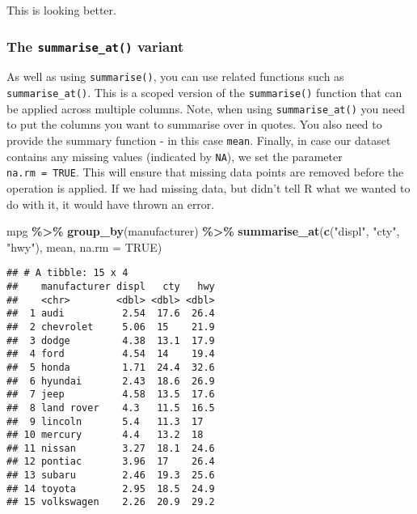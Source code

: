 \documentclass[
]{book}
\newenvironment{Shaded}{\begin{snugshade}}{\end{snugshade}}
\newcommand{\AttributeTok}[1]{\textcolor[rgb]{0.13,0.29,0.53}{#1}}
\newcommand{\ConstantTok}[1]{\textcolor[rgb]{0.56,0.35,0.01}{#1}}
\newcommand{\FunctionTok}[1]{\textcolor[rgb]{0.13,0.29,0.53}{\textbf{#1}}}
\newcommand{\NormalTok}[1]{#1}
\newcommand{\SpecialCharTok}[1]{\textcolor[rgb]{0.81,0.36,0.00}{\textbf{#1}}}
\newcommand{\StringTok}[1]{\textcolor[rgb]{0.31,0.60,0.02}{#1}}
\begin{document}
This is looking better.

\hypertarget{the-summarise_at-variant}{%
\subsubsection*{\texorpdfstring{The \texttt{summarise\_at()} variant}{The summarise\_at() variant}}\label{the-summarise_at-variant}}

As well as using \texttt{summarise()}, you can use related functions such as \texttt{summarise\_at()}. This is a scoped version of the \texttt{summarise()} function that can be applied across multiple columns. Note, when using \texttt{summarise\_at()} you need to put the columns you want to summarise over in quotes. You also need to provide the summary function - in this case \texttt{mean}. Finally, in case our dataset contains any missing values (indicated by \texttt{NA}), we set the parameter \texttt{na.rm\ =\ TRUE}. This will ensure that missing data points are removed before the operation is applied. If we had missing data, but didn't tell R what we wanted to do with it, it would have thrown an error.

\begin{Shaded}
\begin{Highlighting}[]
\NormalTok{mpg }\SpecialCharTok{\%\textgreater{}\%} 
  \FunctionTok{group\_by}\NormalTok{(manufacturer) }\SpecialCharTok{\%\textgreater{}\%}
  \FunctionTok{summarise\_at}\NormalTok{(}\FunctionTok{c}\NormalTok{(}\StringTok{"displ"}\NormalTok{, }\StringTok{"cty"}\NormalTok{, }\StringTok{"hwy"}\NormalTok{), mean, }\AttributeTok{na.rm =} \ConstantTok{TRUE}\NormalTok{)}
\end{Highlighting}
\end{Shaded}

\begin{verbatim}
## # A tibble: 15 x 4
##    manufacturer displ   cty   hwy
##    <chr>        <dbl> <dbl> <dbl>
##  1 audi          2.54  17.6  26.4
##  2 chevrolet     5.06  15    21.9
##  3 dodge         4.38  13.1  17.9
##  4 ford          4.54  14    19.4
##  5 honda         1.71  24.4  32.6
##  6 hyundai       2.43  18.6  26.9
##  7 jeep          4.58  13.5  17.6
##  8 land rover    4.3   11.5  16.5
##  9 lincoln       5.4   11.3  17  
## 10 mercury       4.4   13.2  18  
## 11 nissan        3.27  18.1  24.6
## 12 pontiac       3.96  17    26.4
## 13 subaru        2.46  19.3  25.6
## 14 toyota        2.95  18.5  24.9
## 15 volkswagen    2.26  20.9  29.2
\end{verbatim}
\end{document}

